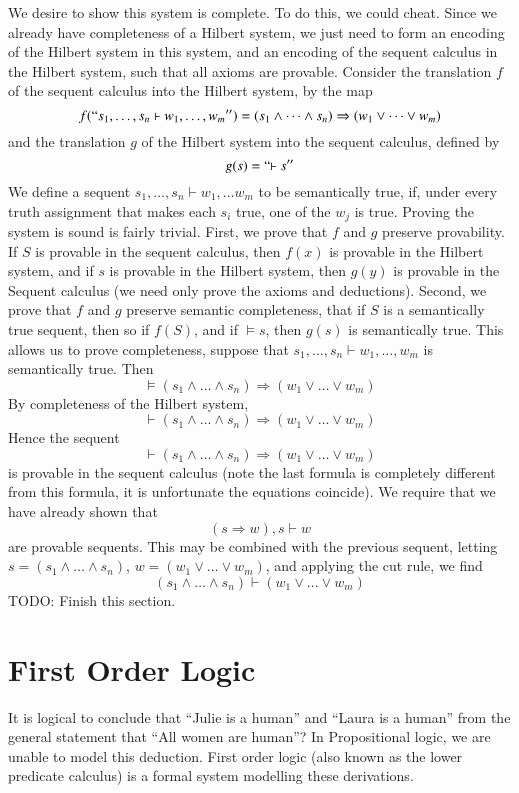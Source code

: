 We desire to show this system is complete. To do this, we could cheat. Since we already have completeness of a Hilbert system, we just need to form an encoding of the Hilbert system in this system, and an encoding of the sequent calculus in the Hilbert system, such that all axioms are provable. Consider the translation $f$ of the sequent calculus into the Hilbert system, by the map
%
\[ f(``{s_1, \dots, s_n \vdash w_1, \dots, w_m}'') = (s_1 \wedge \dots \wedge s_n) \Rightarrow (w_1 \vee \dots \vee w_m) \]
%
and the translation $g$ of the Hilbert system into the sequent calculus, defined by
%
\[ g(s) = ``{\vdash s}'' \]
%
We define a sequent $s_1, \dots, s_n \vdash w_1, \dots w_m $ to be semantically true, if, under every truth assignment that makes each $s_i$ true, one of the $w_j$ is true. Proving the system is sound is fairly trivial. First, we prove that $f$ and $g$ preserve provability. If $S$ is provable in the sequent calculus, then $f(x)$ is provable in the Hilbert system, and if $s$ is provable in the Hilbert system, then $g(y)$ is provable in the Sequent calculus (we need only prove the axioms and deductions). Second, we prove that $f$ and $g$ preserve semantic completeness, that if $S$ is a semantically true sequent, then so if $f(S)$, and if $\vDash s$, then $g(s)$ is semantically true. This allows us to prove completeness, suppose that $s_1, \dots, s_n \vdash w_1, \dots, w_m$ is semantically true. Then
%
\[ \vDash (s_1 \wedge \dots \wedge s_n) \Rightarrow (w_1 \vee \dots \vee w_m) \]
%
By completeness of the Hilbert system,
%
\[ \vdash (s_1 \wedge \dots \wedge s_n) \Rightarrow (w_1 \vee \dots \vee w_m) \]
%
Hence the sequent
%
\[ \vdash (s_1 \wedge \dots \wedge s_n) \Rightarrow (w_1 \vee \dots \vee w_m) \]
%
is provable in the sequent calculus (note the last formula is completely different from this formula, it is unfortunate the equations coincide). We require that we have already shown that
%
\[ (s \Rightarrow w), s \vdash w \]
%
are provable sequents. This may be combined with the previous sequent, letting $s = (s_1 \wedge \dots \wedge s_n)$, $w = (w_1 \vee \dots \vee w_m)$, and applying the cut rule, we find
%
\[ (s_1 \wedge \dots \wedge s_n) \vdash (w_1 \vee \dots \vee w_m) \]
%
TODO: Finish this section.



\chapter{First Order Logic}

It is logical to conclude that ``Julie is a human'' and ``Laura is a human'' from the general statement that ``All women are human''? In Propositional logic, we are unable to model this deduction. First order logic (also known as the lower predicate calculus) is a formal system modelling these derivations.

